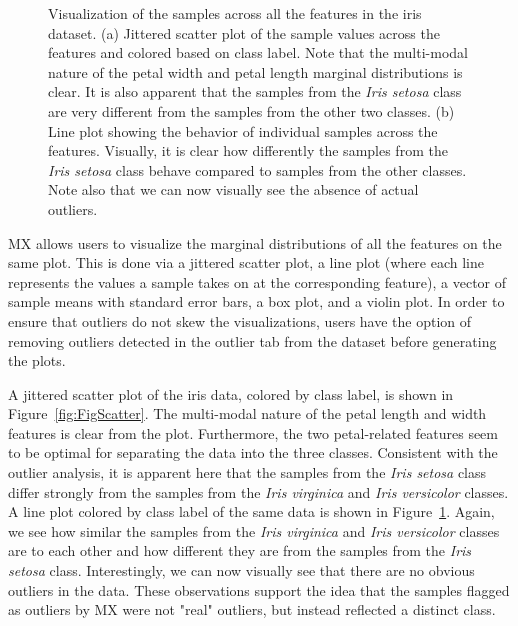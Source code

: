 \documentclass{article}
\begin{document}
\begin{figure}[t!]
\begin{subfigure}[t]{0.48\textwidth}
		\subcaption{}
		\label{fig:FigLine}
	\end{subfigure}
	\vspace{-1.5\baselineskip}
	\caption{Visualization of the samples across all the features in the iris dataset. (a) Jittered scatter plot of the sample values across the features and colored based on class label. Note that the multi-modal nature of the petal width and petal length marginal distributions is clear. It is also apparent that the samples from the \textit{Iris setosa} class are very different from the samples from the other two classes. (b) Line plot showing the behavior of individual samples across the features. Visually, it is clear how differently the samples from the \textit{Iris setosa} class behave compared to samples from the other classes. Note also that we can now visually see the absence of actual outliers.}
	\label{fig:FigFeature}
\end{figure}

MX allows users to visualize the marginal distributions of all the features on the same plot. This is done via a jittered scatter plot, a line plot (where each line represents the values a sample takes on at the corresponding feature), a vector of sample means with standard error bars, a box plot, and a violin plot. In order to ensure that outliers do not skew the visualizations, users have the option of removing outliers detected in the outlier tab from the dataset before generating the plots. 

A jittered scatter plot of the iris data, colored by class label, is shown in Figure~\ref{fig:FigScatter}. The multi-modal nature of the petal length and width features is clear from the plot. Furthermore, the two petal-related features seem to be optimal for separating the data into the three classes. Consistent with the outlier analysis, it is apparent here that the samples from the \textit{Iris setosa} class differ strongly from the samples from the \textit{Iris virginica} and \textit{Iris versicolor} classes. A line plot colored by class label of the same data is shown in Figure~\ref{fig:FigLine}. Again, we see how similar the samples from the \textit{Iris virginica} and \textit{Iris versicolor} classes are to each other and how different they are from the samples from the \textit{Iris setosa} class. Interestingly, we can now visually see that there are no obvious outliers in the data. These observations support the idea that the samples flagged as outliers by MX were not "real" outliers, but instead reflected a distinct class.
\end{document}

